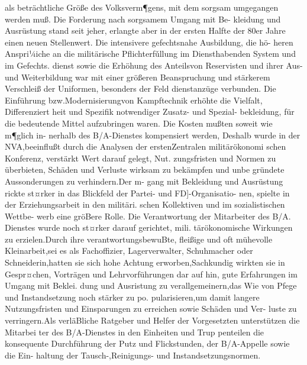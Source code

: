 als beträchtliche Größe des Volksverm¶gens, mit
dem sorgsam umgegangen werden muß.
Die Forderung nach sorgsamem Umgang mit Be-
kleidung und Ausrüstung stand seit jeher, erlangte
aber in der ersten Halfte der 80er Jahre einen
neuen Stellenwert.
Die intensivere gefechtsnahe Ausbildung, die hö-
heren Anspri¼iche an die militärische Pflichterfǔllung im Diensthabenden System und im Gefechts.
dienst sowie die Erhöhung des Anteilsvon
Reservisten und ihrer Aus- und Weiterbildung war
mit einer größeren Beanspruchung und stärkerem
Verschleiß der Uniformen, besonders der Feld
dienstanzüge verbunden.
Die Einführung bzw.Modernisierungvon
Kampftechnik erhöhte die Vielfalt, Differenziert
heit und Spezifik notwendiger Zusatz- und Spezial-
bekleidung, für die bedeutende Mittel aufzubringen
waren. Die Kosten mußten soweit wie m¶glich in-
nerhalb des B/A-Dienstes kompensiert werden,
Deshalb wurde in der NVA,beeinflußt durch die
Analysen der erstenZentralen militärökonomi
schen Konferenz, verstärkt Wert darauf gelegt, Nut.
zungsfristen und Normen zu überbieten, Schäden
und Verluste wirksam zu bekämpfen und unbe
gründete Aussonderungen zu verhindern.Der m-
gang mit Bekleidung und Ausrüstung rickte st¤rker
in das Blickfeld der Partei- und FD]-Organisatio-
nen, spielte in der Erziehungsarbeit in den militäri.
schen Kollektiven und im sozialistischen Wettbe-
werb eine gröBere Rolle.
Die Verantwortung der Mitarbeiter des B/A.
Dienstes wurde noch st¤rker darauf gerichtet, mili.
tärökonomische Wirkungen zu erzielen.Durch ihre
verantwortungsbewuBte, fleißige und oft mühevolle
Kleinarbeit,sei es als Fachoffizier, Lagerverwalter,
Schuhmacher oder Schneiderin,hatten sie sich
hohe Achtung erworben,Sachkundig wirkten sie in
Gespr¤chen, Vorträgen und Lehrvorführungen dar
auf hin, gute Erfahrungen im Umgang mit Beklei.
dung und Ausristung zu verallgemeinern,das Wie
von Pfege und Instandsetzung noch stärker zu po.
pularisieren,um damit langere Nutzungsfristen und
Einsparungen zu erreichen sowie Schäden und Ver-
luste zu verringern.Als verläBliche Ratgeber und
Helfer der Vorgesetzten unterstützen die Mitarbei
ter des B/A-Dienstes in den Einheiten und Trup
penteilen die konsequente Durchführung der Putz
und Flickstunden, der B/A-Appelle sowie die Ein-
haltung der Tausch-,Reinigungs- und Instandsetzungsnormen.